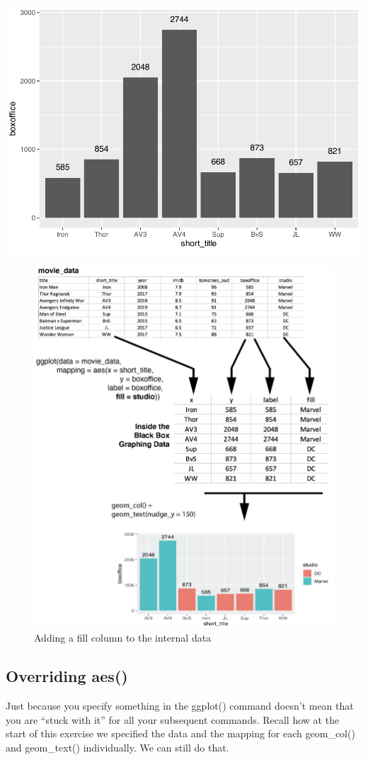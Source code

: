\documentclass[
]{krantz}
\begin{document}
\includegraphics[width=0.65\linewidth]{bookdown_files/figure-latex/unnamed-chunk-113-1}

\begin{figure}
\includegraphics[width=0.7\linewidth]{ch_graphing/images/mapping_fill} \caption{Adding a fill column to the internal data}\label{fig:addfill}
\end{figure}

\hypertarget{overriding-aes}{%
\subsection{Overriding aes()}\label{overriding-aes}}

Just because you specify something in the ggplot() command doesn't mean that you are ``stuck with it'' for all your subsequent commands. Recall how at the start of this exercise we specified the data and the mapping for each geom\_col() and geom\_text() individually. We can still do that.
\end{document}
